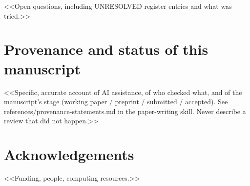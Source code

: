 \begin{question}\label{q:open}
<<Open questions, including UNRESOLVED register entries and what was tried.>>
\end{question}

\section*{Provenance and status of this manuscript}
<<Specific, accurate account of AI assistance, of who checked what, and of the
manuscript's stage (working paper / preprint / submitted / accepted). See
references/provenance-statements.md in the paper-writing skill. Never describe
a review that did not happen.>>

\section*{Acknowledgements}
<<Funding, people, computing resources.>>





